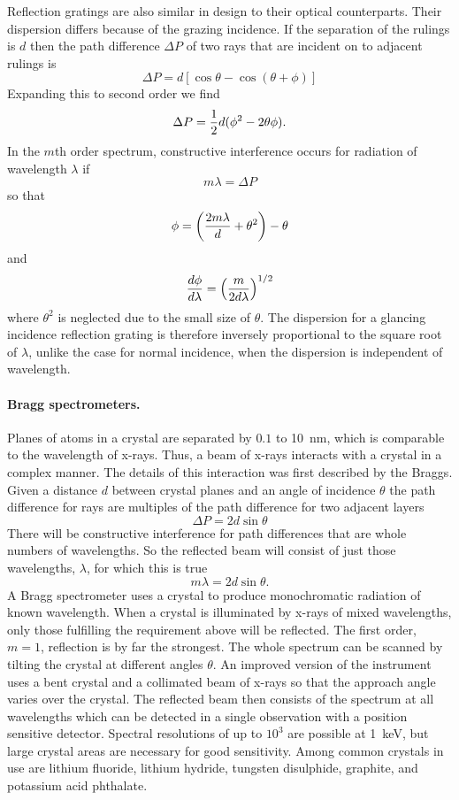 \documentclass{article}
\begin{document}
Reflection gratings are also similar in design to their optical counterparts.
Their dispersion differs because of the grazing incidence. If the separation
of the rulings is $d$ then the path difference $\Delta P$ of two rays that
are incident on to adjacent rulings is
\[
\Delta P=d[\cos\theta-\cos(\theta+\phi)]
\]
Expanding this to second order we find
\[
\Delta P={1\over 2}d(\phi^2-2\theta\phi).
\]
In the $m$th order spectrum, constructive interference occurs for radiation
of wavelength $\lambda$ if 
\[
m\lambda=\Delta P
\]
so that
\[
\phi=\left({{2m\lambda\over d}+\theta^2}\right)-\theta
\]
and
\[
{d\phi\over d\lambda}=\left({m\over 2d\lambda}\right)^{1/2}
\]
where $\theta^2$ is neglected due to the small size of $\theta$. The
dispersion for a glancing incidence reflection grating is therefore inversely
proportional to the square root of $\lambda$, unlike the case for normal 
incidence, when the dispersion is independent of wavelength.

\paragraph{Bragg spectrometers.} Planes of atoms in a crystal are separated by $0.1$ to 10~nm, which
is comparable to the wavelength of x-rays. Thus, a beam of x-rays interacts with a crystal in 
a complex manner. The details of this interaction was first described by the Braggs. Given
a distance $d$ between crystal planes and an angle of incidence $\theta$ the path difference 
for rays are multiples of the path difference for two adjacent layers
\[ \Delta P=2d\sin\theta \]
There will be constructive interference for path differences that are whole numbers of wavelengths. So the reflected beam will consist of just those wavelengths, $\lambda$, 
for which this is true
\[ m\lambda=2d\sin\theta. \]
A  Bragg spectrometer uses a crystal to produce monochromatic radiation of known wavelength.
When a crystal is illuminated by x-rays of mixed wavelengths, only those fulfilling the requirement above will be reflected. The first order, $m=1$, reflection is by far the strongest.
The whole spectrum can be scanned by tilting the crystal at different angles $\theta$. An improved version of the instrument uses a bent crystal and a collimated beam of x-rays so that 
the approach angle varies over the crystal. The reflected beam then consists of the spectrum at
all wavelengths which can be detected in a single observation with a position sensitive detector. 
Spectral resolutions of up to $10^3$ are possible at 1~keV, but large crystal areas are necessary for good sensitivity.  Among common crystals in use are lithium fluoride, lithium hydride, 
tungsten disulphide, graphite, and potassium acid phthalate. 
\end{document}
